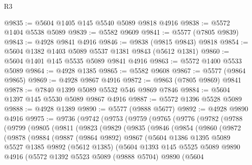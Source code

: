 \begin{lexlean}{R3}
\begin{coremodule}
@9835 := @5604 @1405 @145 @5540 @5089 @9818 @4916
@9838 := @5572 @1404 @5538 @5089
@9839 := @5582 @9609
@9841 := @5577 (@7805 @9839)
@9843 := @4928 @9841 @4916
@9846 := @9838 (@9815 @9843) @9818
@9854 := @5604 @1382 @1403 @5089 @5537 @1381 @9843 (@5612 @1381)
@9860 := @5604 @1401 @145 @5535 @5089 @9841 @4916
@9863 := @5572 @1400 @5533 @5089
@9864 := @4928 @1385
@9865 := @5582 @9608
@9867 := @5577 (@9864 @9865)
@9869 := @4928 @9867 @4916
@9872 := @9863 (@7805 @9869) @9841
@9878 := @7840 @1399 @5089 @5532 @546 @9869 @7846
@9884 := @5604 @1397 @145 @5530 @5089 @9867 @4916
@9887 := @5572 @1396 @5528 @5089
@9888 := @4928 @1389
@9890 := @5577 (@9888 @5677)
@9892 := @4928 @9890 @4916
@9975 := @9736
    (@9742
      (@9753
        (@9759
          (@9765
            (@9776
              (@9782
                (@9788
                  (@9799
                    (@9805
                      (@9811
                        (@9823
                          (@9829
                            (@9835
                              (@9846
                                (@9854
                                  (@9860
                                    (@9872
                                      (@9878
                                        (@9884
                                          (@9887
                                            (@9864 @9892)
                                            @9867
                                            (@5604
                                              @1386
                                              @1395
                                              @5089
                                              @5527
                                              @1385
                                              @9892
                                              (@5612 @1385)
                                              (@5604
                                                @1393
                                                @145
                                                @5525
                                                @5089
                                                @9890
                                                @4916
                                                (@5572
                                                  @1392
                                                  @5523
                                                  @5089
                                                  (@9888 @5704)
                                                  @9890
                                                  (@5604

\end{coremodule}
\end{lexlean}
